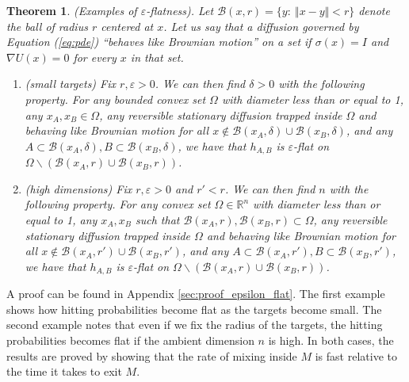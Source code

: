 \documentclass[12pt, nofootinbib,english, amsmath, amssymb, aps, priprint, graphicx,floatfix]{revtex4-1}
\newtheorem{theorem}{Theorem}
\theoremstyle{plain}
\theoremstyle{definition}
\theoremstyle{plain}
\newcommand{\bb}[1]{\mathcal{B}\left(#1\right)}
\begin{document}
\begin{theorem}\label{thm:epsilon_flat} (Examples of $\varepsilon$-flatness).   Let $\bb{x,r} = \{y:\ \Vert x-y \Vert < r\}$ denote the ball of radius $r$ centered at $x$.  Let us say that a diffusion governed by Equation (\ref{eq:pde}) ``behaves like Brownian motion'' on a set if $\sigma(x)=I$ and $\nabla U(x)=0$ for every $x$ in that set.  
\begin{enumerate}
    \item (small targets) Fix $r,\varepsilon>0$.  We can then find $\delta>0$ with the following property.  For any bounded convex set $\Omega$ with diameter less than or equal to 1, any $x_A,x_B \in \Omega$, any reversible stationary diffusion trapped inside $\Omega$ and behaving like Brownian motion for all $x\notin \bb{x_A, \delta} \cup \bb{x_B, \delta}$, and any $A\subset \bb{x_A, \delta}, B \subset \bb{x_B, \delta}$, we have that $h_{A,B}$ is $\varepsilon$-flat on $\Omega \backslash (\bb{x_A, r} \cup \bb{x_B, r})$.
    \item (high dimensions) Fix $r,\varepsilon>0$ and $r'<r$.  We can then find $n$ with the following property.  For any convex set $\Omega \in \mathbb{R}^n$ with diameter less than or equal to 1, any $x_A,x_B$ such that $\bb{x_A, r},\bb{x_B, r} \subset \Omega$, any reversible stationary diffusion trapped inside $\Omega$ and behaving like Brownian motion for all $x\notin \bb{x_A, r'} \cup \bb{x_B, r'}$, and any $A\subset \bb{x_A, r'}, B \subset \bb{x_B, r'}$, we have that $h_{A,B}$ is $\varepsilon$-flat on $\Omega \backslash (\bb{x_A, r} \cup \bb{x_B, r})$.
\end{enumerate}
\end{theorem}

A proof can be found in Appendix \ref{sec:proof_epsilon_flat}.  The first example shows how hitting probabilities become flat as the targets become small.  The second example notes that even if we fix the radius of the targets, the hitting probabilities becomes flat if the ambient dimension $n$ is high.  In both cases, the results are proved by showing that the rate of mixing inside $M$ is fast relative to the time it takes to exit $M$.

                                                         
\end{document}
